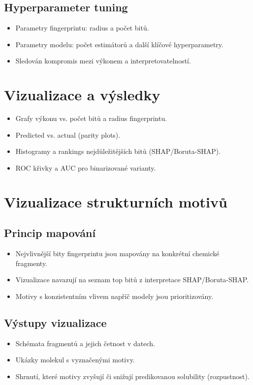 \documentclass[12pt]{article}
\begin{document}
\subsection{Hyperparameter tuning}
\begin{itemize}
  \item Parametry fingerprintu: radius a počet bitů.
  \item Parametry modelu: počet estimátorů a další klíčové hyperparametry.
  \item Sledován kompromis mezi výkonem a interpretovatelností.
\end{itemize}


\section{Vizualizace a výsledky}
\begin{itemize}
  \item Grafy výkonu vs. počet bitů a radius fingerprintu.
  \item Predicted vs. actual (parity plots).
  \item Histogramy a rankings nejdůležitějších bitů (SHAP/Boruta-SHAP).
  \item ROC křivky a AUC pro binarizované varianty.
\end{itemize}

\section{Vizualizace strukturních motivů}
\subsection{Princip mapování}
\begin{itemize}
  \item Nejvlivnější bity fingerprintu jsou mapovány na konkrétní chemické fragmenty.
  \item Vizualizace navazují na seznam top bitů z interpretace SHAP/Boruta-SHAP.
  \item Motivy s konzistentním vlivem napříč modely jsou prioritizovány.
\end{itemize}
\subsection{Výstupy vizualizace}
\begin{itemize}
  \item Schémata fragmentů a jejich četnost v datech.
  \item Ukázky molekul s vyznačenými motivy.
  \item Shrnutí, které motivy zvyšují či snižují predikovanou solubility (rozpustnost).
\end{itemize}
\end{document}
